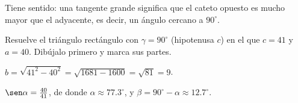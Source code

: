 \documentclass[11pt]{article}
\begin{document}
\begin{preguntas}
\begin{solucion}[2.5cm]
Tiene sentido: una tangente grande significa que el cateto opuesto es mucho mayor que el
adyacente, es decir, un ángulo cercano a $90^\circ$.
\end{solucion}

\pregunta[1] Resuelve el triángulo rectángulo con $\gamma = 90^\circ$ (hipotenusa $c$) en el
que $c = 41$ y $a = 40$. Dibújalo primero y marca sus partes.
\begin{solucion}[4cm]
$b = \sqrt{41^2 - 40^2} = \sqrt{1681 - 1600} = \sqrt{81} = 9$.

$\sen \alpha = \frac{40}{41}$, de donde $\alpha \approx \num{77,3}^\circ$, y
$\beta = 90^\circ - \alpha \approx \num{12,7}^\circ$.
\end{solucion}

\end{preguntas}
\end{document}
